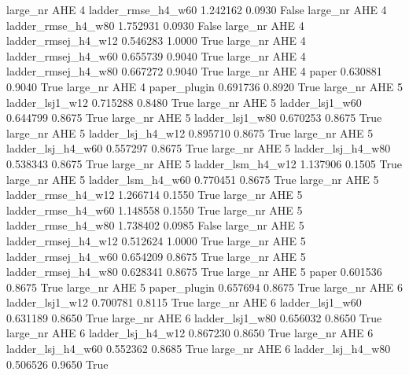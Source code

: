   large_nr      AHE                 4  ladder_rmse_h4_w60    1.242162      0.0930   False
  large_nr      AHE                 4  ladder_rmse_h4_w80    1.752931      0.0930   False
  large_nr      AHE                 4 ladder_rmsej_h4_w12    0.546283      1.0000    True
  large_nr      AHE                 4 ladder_rmsej_h4_w60    0.655739      0.9040    True
  large_nr      AHE                 4 ladder_rmsej_h4_w80    0.667272      0.9040    True
  large_nr      AHE                 4               paper    0.630881      0.9040    True
  large_nr      AHE                 4        paper_plugin    0.691736      0.8920    True
  large_nr      AHE                 5     ladder_lsj1_w12    0.715288      0.8480    True
  large_nr      AHE                 5     ladder_lsj1_w60    0.644799      0.8675    True
  large_nr      AHE                 5     ladder_lsj1_w80    0.670253      0.8675    True
  large_nr      AHE                 5   ladder_lsj_h4_w12    0.895710      0.8675    True
  large_nr      AHE                 5   ladder_lsj_h4_w60    0.557297      0.8675    True
  large_nr      AHE                 5   ladder_lsj_h4_w80    0.538343      0.8675    True
  large_nr      AHE                 5   ladder_lsm_h4_w12    1.137906      0.1505    True
  large_nr      AHE                 5   ladder_lsm_h4_w60    0.770451      0.8675    True
  large_nr      AHE                 5  ladder_rmse_h4_w12    1.266714      0.1550    True
  large_nr      AHE                 5  ladder_rmse_h4_w60    1.148558      0.1550    True
  large_nr      AHE                 5  ladder_rmse_h4_w80    1.738402      0.0985   False
  large_nr      AHE                 5 ladder_rmsej_h4_w12    0.512624      1.0000    True
  large_nr      AHE                 5 ladder_rmsej_h4_w60    0.654209      0.8675    True
  large_nr      AHE                 5 ladder_rmsej_h4_w80    0.628341      0.8675    True
  large_nr      AHE                 5               paper    0.601536      0.8675    True
  large_nr      AHE                 5        paper_plugin    0.657694      0.8675    True
  large_nr      AHE                 6     ladder_lsj1_w12    0.700781      0.8115    True
  large_nr      AHE                 6     ladder_lsj1_w60    0.631189      0.8650    True
  large_nr      AHE                 6     ladder_lsj1_w80    0.656032      0.8650    True
  large_nr      AHE                 6   ladder_lsj_h4_w12    0.867230      0.8650    True
  large_nr      AHE                 6   ladder_lsj_h4_w60    0.552362      0.8685    True
  large_nr      AHE                 6   ladder_lsj_h4_w80    0.506526      0.9650    True
